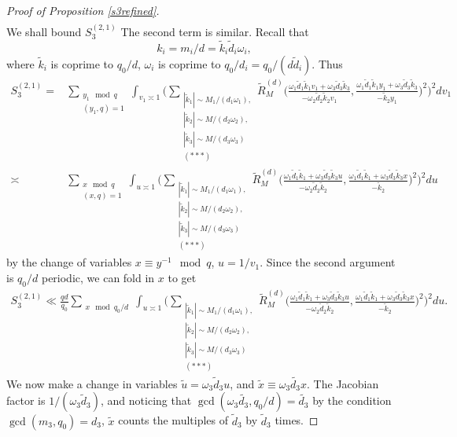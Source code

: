 \begin{proof}[Proof of Proposition \ref{s3refined}]
\begin{align*}
    \end{align*}
    We shall bound $ S_3^{(2,1)}$ The second term is similar. 
    Recall that \[
        k_i = m_i/d = \tilde{k}_i \tilde{d}_i \omega_i,
    \]  
    where $\tilde{k}_i$ is coprime to $q_0/d$, $\omega_i$ is coprime to $q_0/d_i = q_0/(d\tilde{d}_i)$.
    Thus 
    \begin{align*}
        S_3^{(2,1)}=&\sum_{\substack{y_1\mod q\\ (y_1,q)=1} }\int_{v_1\asymp 1}\Bigg(\sum_{\substack{|\tilde{k}_1|\sim M_1/(d_1\omega_1),\\|\tilde{k}_2|\sim M/(d_2\omega_2),\\|\tilde{k}_3|\sim M/(d_3\omega_3)\\
        (***)}}
        \tilde{R}_M^{(d)}\Big(\frac{\omega_1\tilde{d}_1\tilde{k}_1v_1+\omega_3\tilde{d}_3\tilde{k}_3}{-\omega_2\tilde{d}_2\tilde{k}_2v_1},\frac{\omega_1\tilde{d}_1\tilde{k}_1y_1+\omega_3\tilde{d}_3\tilde{k}_3}{-\tilde{k}_2y_1}\Big)^2\Bigg)^2 dv_1
        \\
        \asymp& \sum_{\substack{x \mod q\\ (x,q)=1} }\int_{u\asymp 1}\Bigg(\sum_{\substack{|\tilde{k}_1|\sim M_1/(d_1\omega_1),\\|\tilde{k}_2|\sim M/(d_2\omega_2),\\|\tilde{k}_3|\sim M/(d_3\omega_3)\\
        (***)}}
        \tilde{R}_M^{(d)}\Big(\frac{\omega_1\tilde{d}_1\tilde{k}_1+\omega_3\tilde{d}_3\tilde{k}_3u}{-\omega_2\tilde{d}_2\tilde{k}_2},\frac{\omega_1\tilde{d}_1\tilde{k}_1+\omega_3\tilde{d}_3\tilde{k}_3 x}{-\tilde{k}_2}\Big)^2\Bigg)^2 du
    \end{align*}
    by the change of variables $x\equiv y^{-1}\mod q$, $u=1/v_1$.
    Since the second argument is $q_0/d$ periodic, we can fold in $x$ to get \begin{align*}
        S_3^{(2,1)}\ll
        \frac{qd}{q_0} \sum_{\substack{x \mod q_0/d} }\int_{u\asymp 1}\Bigg(\sum_{\substack{|\tilde{k}_1|\sim M_1/(d_1\omega_1),\\|\tilde{k}_2|\sim M/(d_2\omega_2),\\|\tilde{k}_3|\sim M/(d_3\omega_3)\\
        (***)}}
        \tilde{R}_M^{(d)}\Big(\frac{\omega_1\tilde{d}_1\tilde{k}_1+\omega_3\tilde{d}_3\tilde{k}_3u}{-\omega_2\tilde{d}_2\tilde{k}_2},\frac{\omega_1\tilde{d}_1\tilde{k}_1+\omega_3\tilde{d}_3\tilde{k}_3 x}{-\tilde{k}_2}\Big)^2\Bigg)^2 du.
    \end{align*}
    We now make a change in variables $\tilde{u} = \omega_3\tilde{d}_3u$, and $\tilde{x}\equiv \omega_3\tilde{d_3}x$. The Jacobian factor is $1/(\omega_3\tilde{d}_3)$, and noticing that $\gcd(\omega_3\tilde{d_3},q_0/d) = \tilde{d_3}$ by the condition $\gcd(m_3,q_0) =d_3$, $\tilde{x}$ counts the multiples of $\tilde{d}_3$ by $\tilde{d}_3$ times.

\end{proof}
